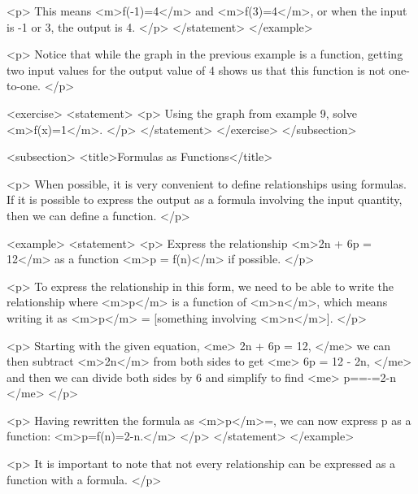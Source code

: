                 <p>
                    This means <m>f(-1)=4</m> and <m>f(3)=4</m>, or when the input is -1 or 3, the output is 4.
                </p>
            </statement>
        </example>

        <p>
            Notice that while the graph in the previous example is a function, getting two input values for the output value of 4 shows us that this function is not one-to-one.
        </p>

        <exercise>
            <statement>
                <p>
                    Using the graph from example 9, solve <m>f(x)=1</m>.
                </p>
            </statement>
        </exercise>
    </subsection>


    <subsection>
        <title>Formulas as Functions</title>

        <p>
            When possible, it is very convenient to define relationships using formulas.
            If it is possible to express the output as a formula involving the input quantity, then we can define a function.
        </p>

        <example>
            <statement>
                <p>
                    Express the relationship <m>2n + 6p = 12</m> as a function <m>p = f(n)</m> if possible.
                </p>

                <p>
                    To express the relationship in this form, we need to be able to write the relationship where <m>p</m> is a function of <m>n</m>, which means writing it as <m>p</m> = [something involving <m>n</m>].
                </p>

                <p>
                    Starting with the given equation,
                    <me>
                        2n + 6p = 12,
                    </me>
                    we can then subtract <m>2n</m> from both sides to get
                    <me>
                        6p = 12 - 2n,
                    </me>
                    and then we can divide both sides by 6 and simplify to find
                    <me>
                        p==-=2-n
                    </me>
                </p>

                <p>
                    Having rewritten the formula as <m>p</m>=, we can now express p as a function: <m>p=f(n)=2-n.</m>
                </p>
            </statement>
        </example>

        <p>
            It is important to note that not every relationship can be expressed as a function with a formula.
        </p>

